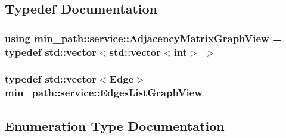 \subsection{Typedef Documentation}
\subsubsection[{\texorpdfstring{Adjacency\+Matrix\+Graph\+View}{AdjacencyMatrixGraphView}}]{\setlength{\rightskip}{0pt plus 5cm}using {\bf min\+\_\+path\+::service\+::\+Adjacency\+Matrix\+Graph\+View} = typedef std\+::vector$<$std\+::vector$<$int$>$ $>$}\hypertarget{a00037_af657481a4b0a05546de6e9c1023bd9f5_af657481a4b0a05546de6e9c1023bd9f5}{}\label{a00037_af657481a4b0a05546de6e9c1023bd9f5_af657481a4b0a05546de6e9c1023bd9f5}
\subsubsection[{\texorpdfstring{Edges\+List\+Graph\+View}{EdgesListGraphView}}]{\setlength{\rightskip}{0pt plus 5cm}typedef std\+::vector$<${\bf Edge}$>$ {\bf min\+\_\+path\+::service\+::\+Edges\+List\+Graph\+View}}\hypertarget{a00037_aa7134896d837083f384364b56a32bb49_aa7134896d837083f384364b56a32bb49}{}\label{a00037_aa7134896d837083f384364b56a32bb49_aa7134896d837083f384364b56a32bb49}


\subsection{Enumeration Type Documentation}
